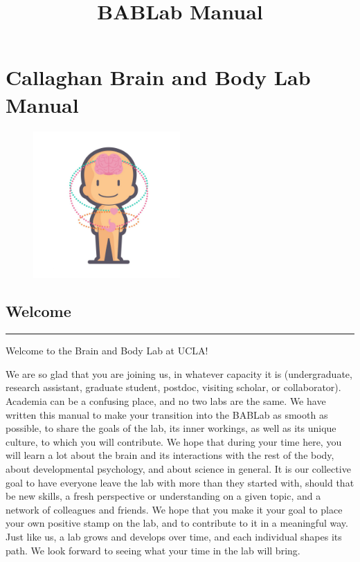 \documentclass[
]{book}
\title{BABLab Manual}
\author{}
\date{\vspace{-2.5em}}
\begin{document}
\maketitle

{
\setcounter{tocdepth}{1}
\tableofcontents
}
\hypertarget{callaghan-brain-and-body-lab-manual}{%
\chapter{Callaghan Brain and Body Lab Manual}\label{callaghan-brain-and-body-lab-manual}}

\begin{figure}
\centering
\includegraphics[width=0.5\textwidth,height=0.5\textheight]{images/index/Icon.jpg}
\caption{}
\end{figure}

\hypertarget{welcome}{%
\section{Welcome}\label{welcome}}

\begin{center}\rule{0.5\linewidth}{0.5pt}\end{center}

Welcome to the Brain and Body Lab at UCLA!

We are so glad that you are joining us, in whatever capacity it is (undergraduate, research assistant, graduate student, postdoc, visiting scholar, or collaborator). Academia can be a confusing place, and no two labs are the same. We have written this manual to make your transition into the BABLab as smooth as possible, to share the goals of the lab, its inner workings, as well as its unique culture, to which you will contribute. We hope that during your time here, you will learn a lot about the brain and its interactions with the rest of the body, about developmental psychology, and about science in general. It is our collective goal to have everyone leave the lab with more than they started with, should that be new skills, a fresh perspective or understanding on a given topic, and a network of colleagues and friends. We hope that you make it your goal to place your own positive stamp on the lab, and to contribute to it in a meaningful way. Just like us, a lab grows and develops over time, and each individual shapes its path. We look forward to seeing what your time in the lab will bring.
\end{document}

